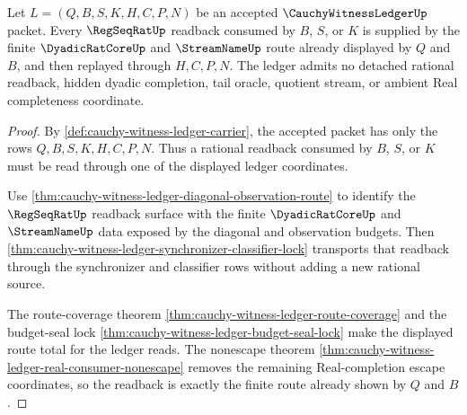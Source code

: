 \begin{theorem}
\label{thm:cauchy-witness-ledger-regseqrat-readback-totality}
Let $L=(Q,B,S,K,H,C,P,N)$ be an accepted
$\CauchyWitnessLedgerUp$ packet. Every $\RegSeqRatUp$ readback consumed by
$B$, $S$, or $K$ is supplied by the finite
$\DyadicRatCoreUp$ and $\StreamNameUp$ route already displayed by $Q$ and
$B$, and then replayed through $H,C,P,N$. The ledger admits no detached
rational readback, hidden dyadic completion, tail oracle, quotient stream, or
ambient Real completeness coordinate.
\end{theorem}
\begin{proof}
By \autoref{def:cauchy-witness-ledger-carrier}, the accepted packet has only
the rows $Q,B,S,K,H,C,P,N$. Thus a rational readback consumed by $B$, $S$, or
$K$ must be read through one of the displayed ledger coordinates.

Use \autoref{thm:cauchy-witness-ledger-diagonal-observation-route} to identify
the $\RegSeqRatUp$ readback surface with the finite
$\DyadicRatCoreUp$ and $\StreamNameUp$ data exposed by the diagonal and
observation budgets. Then
\autoref{thm:cauchy-witness-ledger-synchronizer-classifier-lock} transports
that readback through the synchronizer and classifier rows without adding a
new rational source.

The route-coverage theorem
\autoref{thm:cauchy-witness-ledger-route-coverage} and the budget-seal lock
\autoref{thm:cauchy-witness-ledger-budget-seal-lock} make the displayed route
total for the ledger reads. The nonescape theorem
\autoref{thm:cauchy-witness-ledger-real-consumer-nonescape} removes the
remaining Real-completion escape coordinates, so the readback is exactly the
finite route already shown by $Q$ and $B$.
\end{proof}

